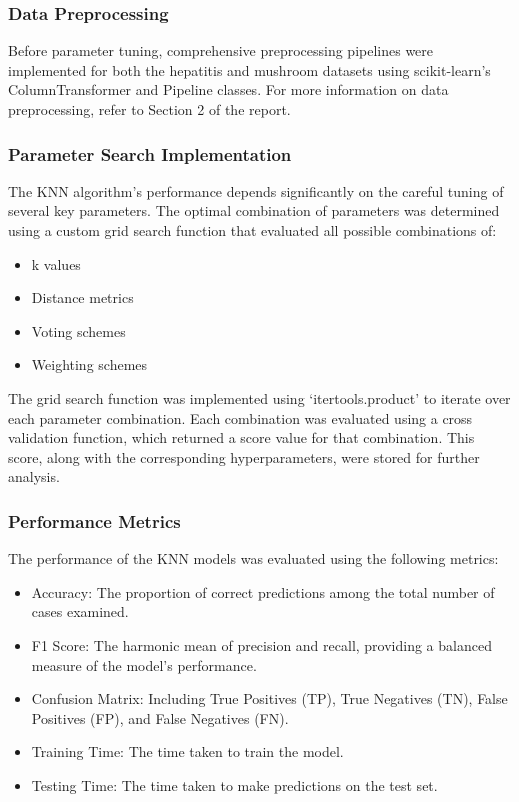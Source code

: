 \subsubsection*{Data Preprocessing}
Before parameter tuning, comprehensive preprocessing pipelines were implemented for both the hepatitis
and mushroom datasets using scikit-learn's ColumnTransformer and Pipeline classes.
For more information on data preprocessing, refer to Section 2 of the report.

\subsubsection*{Parameter Search Implementation}
The KNN algorithm's performance depends significantly on the careful tuning of several key parameters.
The optimal combination of parameters was determined using a custom grid search function that evaluated all possible combinations of:
\begin{itemize}
    \item k values
    \item Distance metrics
    \item Voting schemes
    \item Weighting schemes
\end{itemize}

The grid search function was implemented using `itertools.product' to iterate over each parameter combination.
Each combination was evaluated using a cross validation function, which returned a score value for that combination.
This score, along with the corresponding hyperparameters, were stored for further analysis.

\subsubsection*{Performance Metrics}

The performance of the KNN models was evaluated using the following metrics:

\begin{itemize}
    \item Accuracy: The proportion of correct predictions among the total number of cases examined.
    \item F1 Score: The harmonic mean of precision and recall, providing a balanced measure of the model's performance.
    \item Confusion Matrix: Including True Positives (TP), True Negatives (TN), False Positives (FP), and False Negatives (FN).
    \item Training Time: The time taken to train the model.
    \item Testing Time: The time taken to make predictions on the test set.
\end{itemize}

